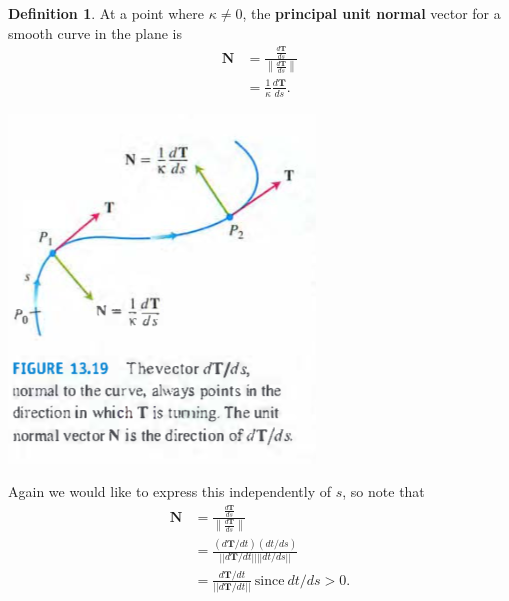 \documentclass[12pt, letter]{article}
\newcommand{\norm}[1]{\left\lVert#1\right\rVert}
\theoremstyle{plain}
\numberwithin{theorem}{section}
\theoremstyle{definition}
\newtheorem{definition}[theorem]{Definition}
\begin{document}
\bigskip

\begin{definition}
At a point where $\kappa \neq 0$, the \textbf{principal unit normal} vector for a smooth curve in the plane is
\begin{align*}
\bm{N} &= \frac{\frac{d\bm{T}}{ds}}{\norm{\frac{d\bm{T}}{ds}}}\\
&= \frac{1}{\kappa} \frac{d\bm{T}}{ds}.
\end{align*}
\end{definition}

\bigskip

\begin{center}
\includegraphics[scale=0.7]{m1_f31}
\end{center}

\bigskip

Again we would like to express this independently of $s$, so note that
\begin{align*}
\bm{N} &= \frac{\frac{d\bm{T}}{ds}}{\norm{\frac{d\bm{T}}{ds}}}\\
&= \frac{(d\bm{T}/dt)(dt/ds)}{||d\bm{T}/dt|| ||dt/ds||}\\
&= \frac{d\bm{T}/dt}{||d\bm{T}/dt||} \ \text{since} \ dt/ds>0.
\end{align*}

\bigskip

\hrulefill

\bigskip
\end{document}
